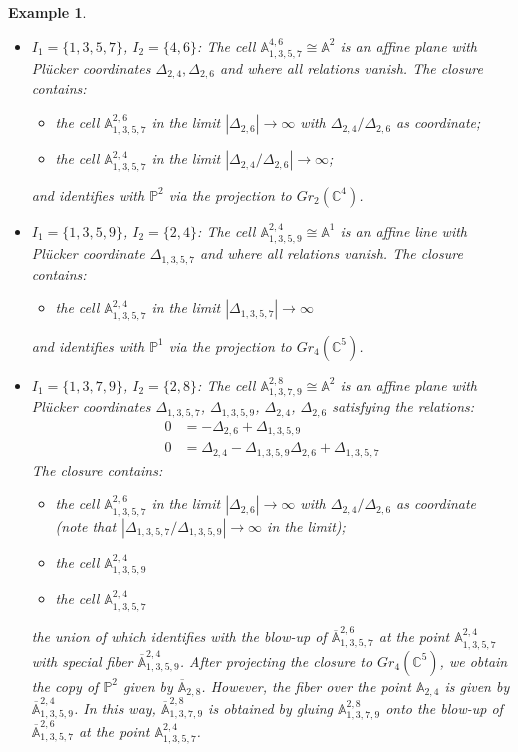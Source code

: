 \documentclass{amsart}
\newtheorem{example}[theorem]{Example}
\numberwithin{equation}{section}
\renewcommand{\AA}{\mathbb{A}}
\newcommand{\CC}{\mathbb{C}}
\newcommand{\PP}{\mathbb{P}}
\begin{document}
\begin{example}
\begin{itemize}
      \item $I_1=\{1,3,5,7\}$, $I_2=\{4,6\}$: The cell $\AA_{1,3,5,7}^{4,6} \cong \AA^2$ is an affine plane with Pl\"ucker coordinates $\Delta_{2,4},\Delta_{2,6}$ and where all relations vanish.
        The closure contains:
        \begin{itemize}
          \item the cell $\AA_{1,3,5,7}^{2,6}$ in the limit $|\Delta_{2,6}|\to\infty$ with $\Delta_{2,4}/\Delta_{2,6}$ as coordinate;
          \item the cell $\AA_{1,3,5,7}^{2,4}$ in the limit $|\Delta_{2,4}/\Delta_{2,6}|\to\infty$;
        \end{itemize}
        and identifies with $\PP^2$ via the projection to $Gr_2(\CC^4)$.

      \item $I_1=\{1,3,5,9\}$, $I_2=\{2,4\}$: The cell $\AA_{1,3,5,9}^{2,4} \cong \AA^1$ is an affine line with Pl\"ucker coordinate $\Delta_{1,3,5,7}$ and where all relations vanish.
        The closure contains:
        \begin{itemize}
          \item the cell $\AA_{1,3,5,7}^{2,4}$ in the limit $|\Delta_{1,3,5,7}|\to\infty$
        \end{itemize}
        and identifies with $\PP^1$ via the projection to $Gr_4(\CC^5)$.

      \item $I_1=\{1,3,7,9\}$, $I_2=\{2,8\}$: The cell $\AA_{1,3,7,9}^{2,8} \cong \AA^2$ is an affine plane with Pl\"ucker coordinates $\Delta_{1,3,5,7}$, $\Delta_{1,3,5,9}$, $\Delta_{2,4}$, $\Delta_{2,6}$ satisfying the relations:
        \begin{align*}
           0 &=  - \Delta_{2,6} + \Delta_{1,3,5,9}\\
           0 &= \Delta_{2,4} - \Delta_{1,3,5,9}\Delta_{2,6} + \Delta_{1,3,5,7}
        \end{align*}
        The closure contains:
        \begin{itemize}
          \item the cell $\AA_{1,3,5,7}^{2,6}$ in the limit $|\Delta_{2,6}|\to\infty$ with $\Delta_{2,4}/\Delta_{2,6}$ as coordinate (note that $|\Delta_{1,3,5,7}/\Delta_{1,3,5,9}|\to\infty$ in the limit);
          \item the cell $\AA_{1,3,5,9}^{2,4}$
          \item the cell $\AA_{1,3,5,7}^{2,4}$
        \end{itemize}
        the union of which identifies with the blow-up of $\overline{\AA}_{1,3,5,7}^{2,6}$ at the point $\AA_{1,3,5,7}^{2,4}$ with special fiber $\overline{\AA}_{1,3,5,9}^{2,4}$.
        After projecting the closure to $Gr_4(\CC^5)$, we obtain the copy of $\PP^2$ given by $\overline{\AA}_{2,8}$.
        However, the fiber over the point $\AA_{2,4}$ is given by $\overline{\AA}_{1,3,5,9}^{2,4}$.
        In this way, $\overline{\AA}_{1,3,7,9}^{2,8}$ is obtained by gluing $\AA_{1,3,7,9}^{2,8}$ onto the blow-up of $\overline{\AA}_{1,3,5,7}^{2,6}$ at the point $\AA_{1,3,5,7}^{2,4}$.


\end{itemize}
\end{example}
\end{document}

